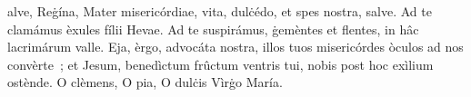 alve, Reġína, Mater misericórdiae, vita, dulċédo, et spes nostra, salve. Ad te clamámus èxules fílii Hevae. Ad te suspirámus, ġemèntes et flentes, in hâc lacrimárum valle. Eja, èrgo, advocáta nostra, illos tuos misericórdes òculos ad nos convèrte~; et Jesum, benedìctum frûctum ventris tui, nobis post hoc exìlium ostènde. O clèmens, O pia, O dulċis Vìrġo María.
